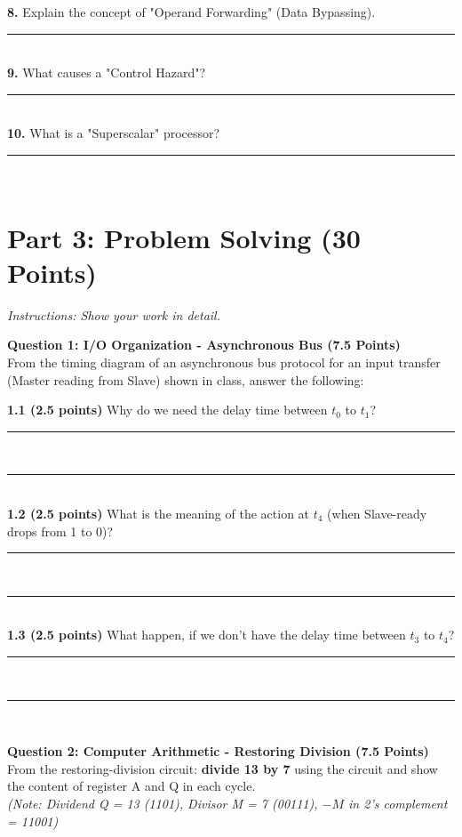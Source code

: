 \documentclass[12pt]{article}
\begin{document}
\textbf{8.} Explain the concept of "Operand Forwarding" (Data Bypassing). \\
\rule{\textwidth}{0.4pt} \\

\textbf{9.} What causes a "Control Hazard"? \\
\rule{\textwidth}{0.4pt} \\

\textbf{10.} What is a "Superscalar" processor? \\
\rule{\textwidth}{0.4pt} \\

\newpage
\section*{Part 3: Problem Solving (30 Points)}
\textit{Instructions: Show your work in detail.}

\textbf{Question 1: I/O Organization - Asynchronous Bus (7.5 Points)} \\
From the timing diagram of an asynchronous bus protocol for an input transfer (Master reading from Slave) shown in class, answer the following:

\textbf{1.1 (2.5 points)} Why do we need the delay time between $t_0$ to $t_1$? \\
\rule{\textwidth}{0.4pt} \\
\rule{\textwidth}{0.4pt} \\

\textbf{1.2 (2.5 points)} What is the meaning of the action at $t_4$ (when Slave-ready drops from 1 to 0)? \\
\rule{\textwidth}{0.4pt} \\
\rule{\textwidth}{0.4pt} \\

\textbf{1.3 (2.5 points)} What happen, if we don't have the delay time between $t_3$ to $t_4$? \\
\rule{\textwidth}{0.4pt} \\
\rule{\textwidth}{0.4pt} \\

\vspace{1cm}

\textbf{Question 2: Computer Arithmetic - Restoring Division (7.5 Points)} \\
From the restoring-division circuit: \textbf{divide 13 by 7} using the circuit and show the content of register A and Q in each cycle. \\
\textit{(Note: Dividend Q = 13 (1101), Divisor M = 7 (00111), $-M$ in 2's complement = 11001)} \\
\end{document}
